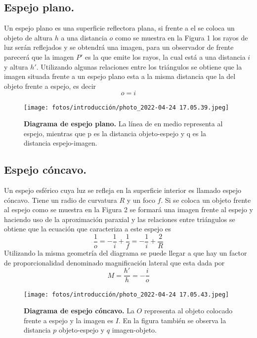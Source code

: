 \documentclass[DIV=calc, paper=a4, fontsize=11pt]{scrartcl}
\begin{document}
 \subsection*{\textcolor{carmine}{Espejo plano.}}
Un espejo plano es una superficie reflectora plana, si frente a el se coloca un objeto de altura $h$ a una distancia $o$ como se muestra en la Figura 1 los rayos de luz serán reflejados y se obtendrá una imagen, para un observador de frente parecerá que la imagen $P'$ es la que emite los rayos, la cual está a una distancia $i$ y altura $h'$\cite{book}. Utilizando algunas relaciones entre los triángulos se obtiene que la imagen situada frente a un espejo plano esta a la misma distancia que la del objeto frente a espejo\cite{Manual}, es decir
\begin{equation}
    o=i
\end{equation}
\begin{figure}[H]
    \centering
    \texttt{[image: fotos/introducción/photo\_2022-04-24 17.05.39.jpeg]}
    \caption{\textbf{Diagrama de espejo plano.} La línea de en medio representa al espejo, mientras que p es la distancia objeto-espejo y q es la distancia espejo-imagen\cite{book}.}
    \label{fig:my_label}
\end{figure}
\subsection*{\textcolor{carmine}{Espejo cóncavo.}}
Un espejo esférico cuya luz se refleja en la superficie interior es llamado espejo cóncavo. Tiene un radio de curvatura $R$ y un foco $f$. Si se coloca un objeto frente al espejo como se muestra en la Figura 2 se formará una imagen frente al espejo y haciendo uso de la aproximación paraxial y las relaciones entre triángulos se obtiene que la ecuación que caracteriza a este espejo es \cite{book}
\begin{equation}
    \frac{1}{o} = -\frac{1}{i} + \frac{1}{f} = -\frac{1}{i} + \frac{2}{R}
\end{equation}
Utilizando la misma geometría del diagrama se puede llegar a que hay un factor de proporcionalidad denominado magnificación lateral que esta dada por
\begin{equation}
  M=\frac{h'}{h}=-\frac{i}{o}
\end{equation}
\begin{figure}[H]
    \centering
    \texttt{[image: fotos/introducción/photo\_2022-04-24 17.05.43.jpeg]}
    \caption{\textbf{Diagrama de espejo cóncavo.} La $O$ representa al objeto colocado frente a espejo y la imagen es $I$. En la figura también se observa la distancia $p$ objeto-espejo y $q$ imagen-objeto\cite{book}.}
    \label{fig:my_label}
\end{figure}
\end{document}
